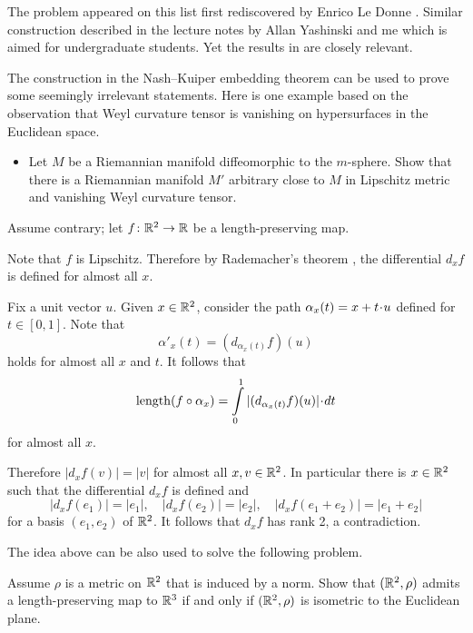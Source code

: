 The problem appeared 
on this list first rediscovered by Enrico Le Donne \cite[see][]{le-donne}.
Similar construction described in the lecture notes by Allan Yashinski and me \cite[see][]{petrunin-yashinsky} 
which is aimed for undergraduate students. 
Yet the results in \cite{petrunin-paths} are closely relevant.

The construction in the Nash--Kuiper embedding theorem
can be used to prove some seemingly irrelevant statements.
Here is one example based on the observation that Weyl curvature tensor 
is vanishing on hypersurfaces in the Euclidean space.
\begin{itemize}
\item Let $M$ be a Riemannian manifold diffeomorphic to the $m$-sphere. 
Show that there is a Riemannian manifold $M'$ arbitrary close to $M$ in Lipschitz metric and vanishing Weyl curvature tensor.
\end{itemize}


Assume contrary;
let $f\colon\mathbb{R}^2\to \mathbb{R}$ be a length-preserving map.

Note that $f$ is Lipschitz.
Therefore by Rademacher's theorem \cite[see][]{rademacher}, the differential $d_xf$ is defined for  almost all $x$.

Fix a unit vector $u$.
Given $x\in\mathbb{R}^2$,
consider the path $\alpha_x(t)\z=x+t\cdot u$ defined for $t\in [0,1]$.
Note that  
\[\alpha'_x(t)=(d_{\alpha_x(t)}f)(u)\]
holds for almost all $x$ and $t$.
It follows that 
\[\length(f\circ\alpha_x)=\int\limits_0^1 |(d_{\alpha_x(t)}f)(u)| \cdot dt\]
for almost all $x$.

Therefore $|d_xf(v)|=|v|$ for almost all $x,v\in\mathbb{R}^2$.
In particular there is $x\in\mathbb{R}^2$ such that the differential $d_xf$ is defined 
and 
\[|d_xf(e_1)|=|e_1|,
\quad
|d_xf(e_2)|=|e_2|,
\quad
|d_xf(e_1+e_2)|=|e_1+e_2|\]
for a basis $(e_1,e_2)$ of $\mathbb{R}^2$.
It follows that $d_xf$ has rank 2, a contradiction. \qeds 


The idea above can be also used to solve the following problem.

\begin{pr} Assume $\rho$ is a metric on $\mathbb{R}^2$ that is induced by a norm.
Show that $(\mathbb{R}^2,\rho)$ admits 
a length-preserving map
to $\mathbb{R}^3$ 
if and only if 
$(\mathbb{R}^2,\rho)$ is isometric to the Euclidean plane.
\end{pr}








